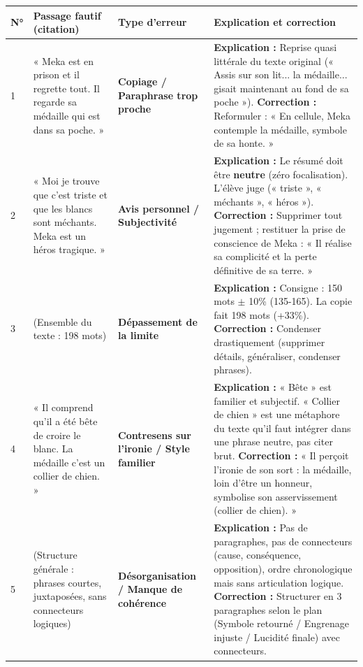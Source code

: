 \documentclass[11pt]{article}
\begin{document}
\begin{exercice}
\begin{center}
\begin{tabularx}{\linewidth}{|l|X|X|X|}\hline
\textbf{N°} & \textbf{Passage fautif (citation)} & \textbf{Type d'erreur} & \textbf{Explication et correction} \\ \hline
1 & « Meka est en prison et il regrette tout. Il regarde sa médaille qui est dans sa poche. » & \textbf{Copiage / Paraphrase trop proche} & \textbf{Explication :} Reprise quasi littérale du texte original (« Assis sur son lit... la médaille... gisait maintenant au fond de sa poche »). \textbf{Correction :} Reformuler : « En cellule, Meka contemple la médaille, symbole de sa honte. » \\ \hline
2 & « Moi je trouve que c'est triste et que les blancs sont méchants. Meka est un héros tragique. » & \textbf{Avis personnel / Subjectivité} & \textbf{Explication :} Le résumé doit être \textbf{neutre} (zéro focalisation). L'élève juge (« triste », « méchants », « héros »). \textbf{Correction :} Supprimer tout jugement ; restituer la prise de conscience de Meka : « Il réalise sa complicité et la perte définitive de sa terre. » \\ \hline
3 & (Ensemble du texte : 198 mots) & \textbf{Dépassement de la limite} & \textbf{Explication :} Consigne : 150 mots $\pm$ 10\% (135-165). La copie fait 198 mots (+33\%). \textbf{Correction :} Condenser drastiquement (supprimer détails, généraliser, condenser phrases). \\ \hline
4 & « Il comprend qu'il a été bête de croire le blanc. La médaille c'est un collier de chien. » & \textbf{Contresens sur l'ironie / Style familier} & \textbf{Explication :} « Bête » est familier et subjectif. « Collier de chien » est une métaphore du texte qu'il faut intégrer dans une phrase neutre, pas citer brut. \textbf{Correction :} « Il perçoit l'ironie de son sort : la médaille, loin d'être un honneur, symbolise son asservissement (collier de chien). » \\ \hline
5 & (Structure générale : phrases courtes, juxtaposées, sans connecteurs logiques) & \textbf{Désorganisation / Manque de cohérence} & \textbf{Explication :} Pas de paragraphes, pas de connecteurs (cause, conséquence, opposition), ordre chronologique mais sans articulation logique. \textbf{Correction :} Structurer en 3 paragraphes selon le plan (Symbole retourné / Engrenage injuste / Lucidité finale) avec connecteurs. \\ \hline
\end{tabularx}
\end{center}
\end{exercice}
\end{document}
